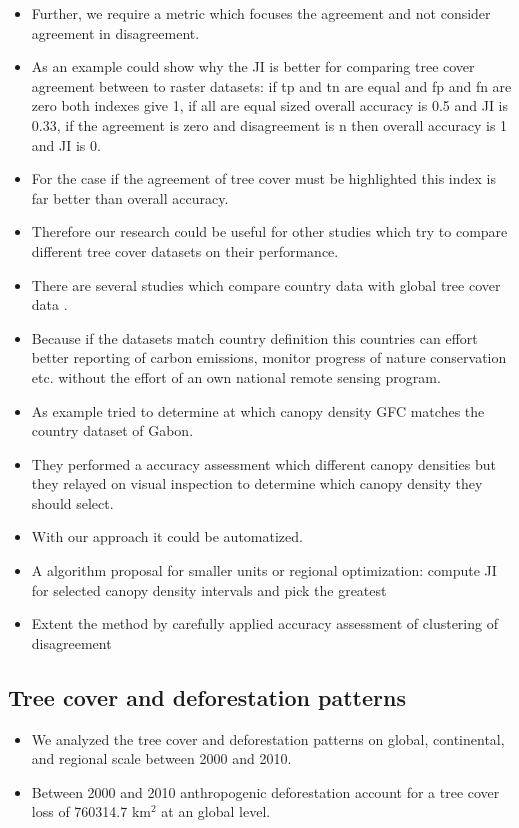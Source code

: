 \begin{itemize}
				\item Further, we require a metric which focuses the agreement and not consider agreement in disagreement.
				\item As an example could show why the \ac{JI} is better for comparing tree cover agreement between to raster datasets: if tp and tn are equal and fp and fn are zero both indexes give 1, if all are equal sized overall accuracy is 0.5 and \ac{JI} is 0.33, if the agreement is zero and disagreement is n then overall accuracy is 1 and \ac{JI} is 0.
				\item For the case if the agreement of tree cover must be highlighted this index is far better than overall accuracy.
				\item Therefore our research could be useful for other studies which try to compare different tree cover datasets on their performance.
				\item There are several studies which compare country data with global tree cover data \citep{Sannier2016,McRoberts2016,Gross2017}.
				\item Because if the datasets match country definition this countries can effort better reporting of carbon emissions, monitor progress of nature conservation etc. without the effort of an own national remote sensing program.
				\item As example \citep{Sannier2016} tried to determine at which canopy density \ac{GFC} matches the country dataset of Gabon.
				\item They performed a accuracy assessment which different canopy densities but they relayed on visual inspection to determine which canopy density they should select.
				\item With our approach it could be automatized.
				\item A algorithm proposal for smaller units or regional optimization: compute \ac{JI} for selected canopy density intervals and pick the greatest
				\item Extent the method by carefully applied accuracy assessment of clustering of disagreement 
			\end{itemize}

		\subsection{Tree cover and deforestation patterns}
		\label{subsec:discussion_tree_cover_and_deforestation}
			\begin{itemize}
				\item We analyzed the tree cover and deforestation patterns on global, continental, and regional scale between 2000 and 2010.
				\item Between 2000 and 2010 anthropogenic deforestation account for a tree cover loss of 760314.7 km$^2$ at an global level.
			\end{itemize}

